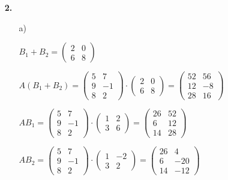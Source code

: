 \documentclass[a4paper,10pt]{scrartcl}
\begin{document}
\begin{enumerate}
\begin{enumerate}
        \end{enumerate}

    \item[\textbf{2.}]
        \begin{enumerate}
            \item[a)]

                $B_1 + B_2 = \begin{pmatrix} 2 & 0 \\ 6 & 8 \end{pmatrix}$

                $A(B_1 + B_2) =
                    \begin{pmatrix} 5 & 7 \\ 9 & -1 \\ 8 & 2 \end{pmatrix} \cdot
                    \begin{pmatrix} 2 & 0 \\ 6 & 8 \end{pmatrix} =
                    \begin{pmatrix} 52 & 56 \\ 12 & -8 \\ 28 & 16 \end{pmatrix}
                    $

                \vspace{1em}

                $AB_1 =
                    \begin{pmatrix} 5 & 7 \\ 9 & -1 \\ 8 & 2 \end{pmatrix} \cdot
                    \begin{pmatrix} 1 & 2 \\ 3 & 6 \end{pmatrix} =
                    \begin{pmatrix} 26 & 52 \\ 6 & 12 \\ 14  & 28 \end{pmatrix}
                    $

                $AB_2 =
                    \begin{pmatrix} 5 & 7 \\ 9 & -1 \\ 8 & 2 \end{pmatrix} \cdot
                    \begin{pmatrix} 1 & -2 \\ 3 & 2 \end{pmatrix} =
                    \begin{pmatrix} 26 & 4 \\ 6 & -20 \\ 14  & -12 \end{pmatrix}
                    $


\end{enumerate}
\end{enumerate}
\end{document}

